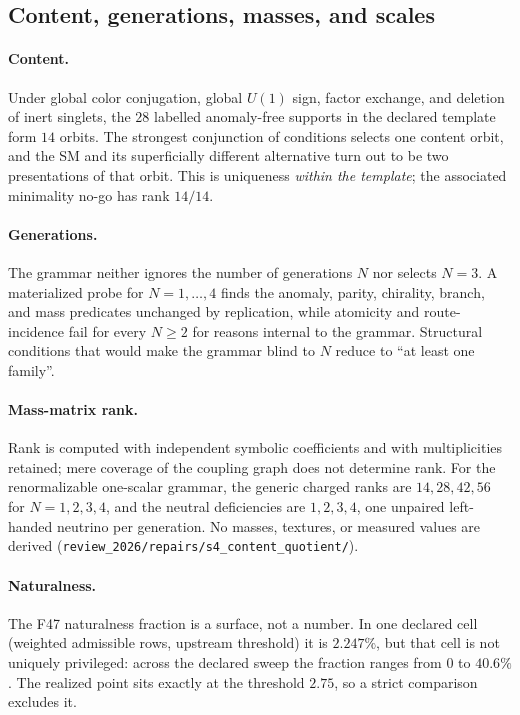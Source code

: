 \documentclass[11pt]{article}
\theoremstyle{definition}
\begin{document}
\subsection{Content, generations, masses, and scales}\label{the-blindness-theorems-what-is-proved-observed-input}

\paragraph{Content.} Under global color conjugation, global \(U(1)\) sign, factor exchange, and deletion of inert
singlets, the \(28\) labelled anomaly-free supports in the declared template form \(14\) orbits. The strongest
conjunction of conditions selects one content orbit, and the SM and its superficially different alternative turn out
to be two presentations of that orbit. This is uniqueness \emph{within the template}; the associated minimality no-go
has rank \(14/14\).

\paragraph{Generations.} The grammar neither ignores the number of generations \(N\) nor selects \(N=3\). A
materialized probe for \(N=1,\dots,4\) finds the anomaly, parity, chirality, branch, and mass predicates unchanged by
replication, while atomicity and route-incidence fail for every \(N\ge2\) for reasons internal to the grammar.
Structural conditions that would make the grammar blind to \(N\) reduce to ``at least one family''.

\paragraph{Mass-matrix rank.} Rank is computed with independent symbolic coefficients and with multiplicities
retained; mere coverage of the coupling graph does not determine rank. For the renormalizable one-scalar grammar, the
generic charged ranks are \(14,28,42,56\) for \(N=1,2,3,4\), and the neutral deficiencies are \(1,2,3,4\), one unpaired
left-handed neutrino per generation. No masses, textures, or measured values are derived
(\nolinkurl{review_2026/repairs/s4_content_quotient/}).

\paragraph{Naturalness.} The F47 naturalness fraction is a surface, not a number. In one declared cell (weighted
admissible rows, upstream threshold) it is \(2.247\%\), but that cell is not uniquely privileged: across the declared
sweep the fraction ranges from \(0\) to \(40.6\%\). The realized point sits exactly at the threshold \(2.75\), so a
strict comparison excludes it.
\end{document}
